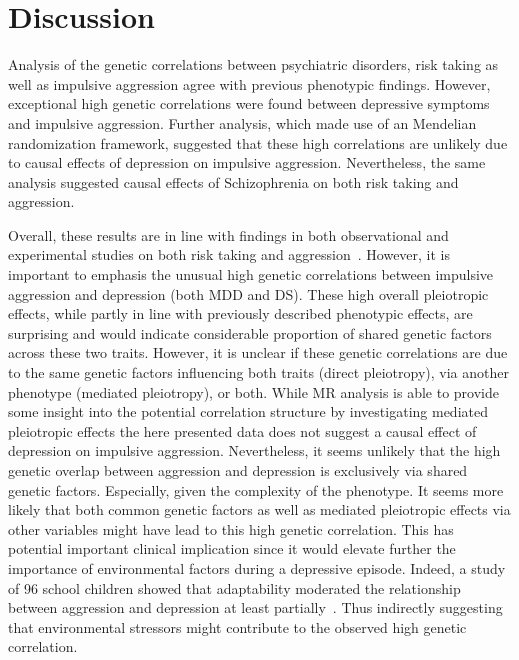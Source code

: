 \section{Discussion}
\label{sec:discussion_ukb_psych}

Analysis of the genetic correlations between psychiatric disorders, risk taking as well as impulsive aggression agree with previous phenotypic findings.
However, exceptional high genetic correlations were found between depressive symptoms and impulsive aggression.
Further analysis, which made use of an Mendelian randomization framework, suggested that these high correlations are unlikely due to causal effects of depression on impulsive aggression.
Nevertheless, the same analysis suggested causal effects of Schizophrenia on both risk taking and aggression. 

Overall, these results are in line with findings in both observational and experimental studies on both risk taking and aggression~\cite{Ballester2012,Ouzir2013,Hoptman2015,Sher2005,Roland2002,Taft2009, Dutton2013}.
However, it is important to emphasis the unusual high genetic correlations between impulsive aggression and depression (both MDD and DS).  
These high overall pleiotropic effects, while partly in line with previously described phenotypic effects, are surprising and would indicate considerable proportion of shared genetic factors across these two traits.
However, it is unclear if these genetic correlations are due to the same genetic factors influencing both traits (direct pleiotropy), via another phenotype (mediated pleiotropy), or both.
While MR analysis is able to provide some insight into the potential correlation structure by investigating mediated pleiotropic effects the here presented data does not suggest a causal effect of depression on impulsive aggression.
Nevertheless, it seems unlikely that the high genetic overlap between aggression and depression is exclusively via shared genetic factors.
Especially, given the complexity of the phenotype.
It seems more likely that both common genetic factors as well as mediated pleiotropic effects via other variables might have lead to this high genetic correlation.
This has potential important clinical implication since it would elevate further the importance of environmental factors during a depressive episode.
Indeed, a study of 96 school children showed that adaptability moderated the relationship between aggression and depression at least partially~\cite{Lee2015a}.  
Thus indirectly suggesting that environmental stressors might contribute to the observed high genetic correlation. 

